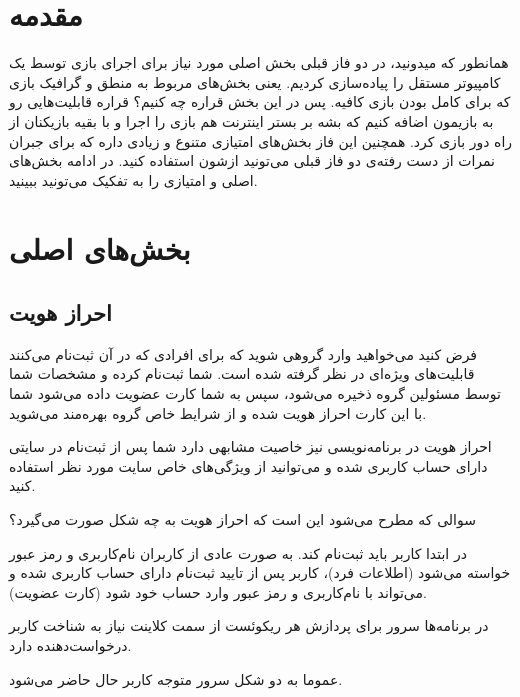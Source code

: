 \documentclass[]{article}
\begin{document}
\newpage

\section*{{\titr مقدمه}}

همانطور که میدونید، در دو فاز قبلی بخش اصلی مورد نیاز برای اجرای بازی توسط یک کامپیوتر مستقل را پیاده‌سازی کردیم. یعنی بخش‌های مربوط به منطق و گرافیک بازی که برای کامل بودن بازی کافیه. پس در این بخش قراره چه کنیم؟ قراره قابلیت‌هایی رو به بازیمون اضافه کنیم که بشه بر بستر اینترنت هم بازی را اجرا و با بقیه بازیکنان از راه دور بازی کرد. همچنین این فاز بخش‌های امتیازی متنوع و زیادی داره که برای جبران نمرات از دست‌ رفته‌ی دو فاز قبلی می‌تونید ازشون استفاده کنید. در ادامه بخش‌های اصلی و امتیازی را به تفکیک می‌تونید ببینید.

\section*{{\titr بخش‌های اصلی}}

\subsection*{{\titr احراز هویت}}

فرض کنید می‌خواهید وارد گروهی شوید که برای افرادی که در آن ثبت‌نام می‌کنند قابلیت‌های ویژه‌ای در نظر گرفته شده است. شما ثبت‌نام کرده و مشخصات شما توسط مسئولین گروه ذخیره می‌شود، سپس به شما کارت عضویت داده می‌شود شما با این کارت احراز هویت شده و از شرایط خاص گروه بهره‌مند می‌شوید.

احراز هویت در برنامه‌نویسی نیز خاصیت مشابهی دارد شما پس از ثبت‌نام در سایتی دارای حساب کاربری شده و می‌توانید از ویژگی‌های خاص سایت مورد نظر استفاده کنید.

سوالی که مطرح می‌شود این است که احراز هویت به چه شکل صورت می‌گیرد؟

در ابتدا کاربر باید ثبت‌نام کند. به صورت عادی از کاربران نام‌کاربری و رمز عبور خواسته می‌شود (اطلاعات فرد)، کاربر پس از تایید ثبت‌نام دارای حساب کاربری شده و می‌تواند با نام‌کاربری و رمز عبور وارد حساب خود شود (کارت عضویت).

در برنامه‌‌ها سرور برای پردازش هر ریکوئست از سمت کلاینت نیاز به شناخت کاربر درخواست‌دهنده دارد.

عموما به دو شکل سرور متوجه کاربر حال حاضر می‌شود.
\end{document}
